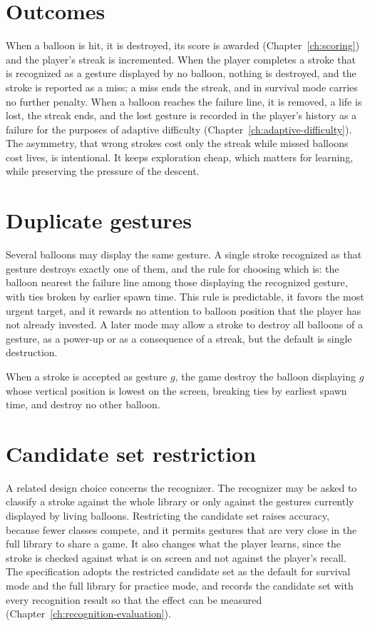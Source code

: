 \section{Outcomes}

When a balloon is hit, it is destroyed, its score is awarded (Chapter~\ref{ch:scoring}) and the player's streak is incremented. When the player completes a stroke that is recognized as a gesture displayed by no balloon, nothing is destroyed, and the stroke is reported as a miss; a miss ends the streak, and in survival mode carries no further penalty. When a balloon reaches the failure line, it is removed, a life is lost, the streak ends, and the lost gesture is recorded in the player's history as a failure for the purposes of adaptive difficulty (Chapter~\ref{ch:adaptive-difficulty}). The asymmetry, that wrong strokes cost only the streak while missed balloons cost lives, is intentional. It keeps exploration cheap, which matters for learning, while preserving the pressure of the descent.\evS

\section{Duplicate gestures}

Several balloons may display the same gesture. A single stroke recognized as that gesture destroys exactly one of them, and the rule for choosing which is: the balloon nearest the failure line among those displaying the recognized gesture, with ties broken by earlier spawn time. This rule is predictable, it favors the most urgent target, and it rewards no attention to balloon position that the player has not already invested. A later mode may allow a stroke to destroy all balloons of a gesture, as a power-up or as a consequence of a streak, but the default is single destruction.

\begin{requirement}\label{req:target}
When a stroke is accepted as gesture $g$, the game \must{} destroy the balloon displaying $g$ whose vertical position is lowest on the screen, breaking ties by earliest spawn time, and \must{} destroy no other balloon.\evS
\end{requirement}

\section{Candidate set restriction}

A related design choice concerns the recognizer. The recognizer may be asked to classify a stroke against the whole library or only against the gestures currently displayed by living balloons. Restricting the candidate set raises accuracy, because fewer classes compete, and it permits gestures that are very close in the full library to share a game. It also changes what the player learns, since the stroke is checked against what is on screen and not against the player's recall. The specification adopts the restricted candidate set as the default for survival mode and the full library for practice mode, and records the candidate set with every recognition result so that the effect can be measured (Chapter~\ref{ch:recognition-evaluation}).\evS

